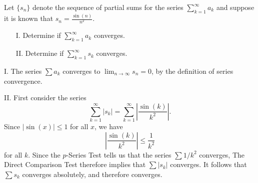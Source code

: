 \documentclass[noauthor]{ximera}
\begin{document}
\begin{problem}
Let $\{s_n\}$ denote the sequence of partial sums for the series $\sum_{k=1}^\infty a_k$ and suppose it is known that $s_n = \frac{\sin(n)}{n^2}.$
\begin{itemize}
\item[I.] Determine if $\sum_{k=1}^{\infty} a_k$ converges.
\item[II.] Determine if $\sum_{k=1}^{\infty} s_k$ converges.
\end{itemize}

\begin{freeResponse}
I. The series $\sum a_k$ converges to $\lim_{n\rightarrow \infty} s_n = 0$, by the definition of series convergence.

II. First consider the series 
$$
\sum_{k=1}^{\infty} |s_k| = \sum_{k=1}^{\infty} \left|\frac{\sin(k)}{k^2} \right|.
$$
Since $|\sin(x)| \leq 1$ for all $x$, we have 
$$
\left|\frac{\sin(k)}{k^2} \right| \leq \frac{1}{k^2}
$$
for all $k$. Since the $p$-Series Test tells us that the series $\sum 1/k^2$ converges, The Direct Comparison Test therefore implies that $\sum |s_k|$ converges. It follows that $\sum s_k$ converges absolutely, and therefore converges.
\end{freeResponse}
\end{problem}
\end{document}
